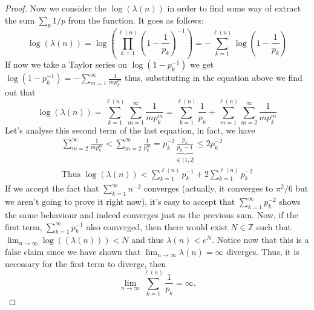 \begin{proof}
   Now we consider the \(\log(\lambda(n))\) in order to find some way of extract
   the sum \(\sum_p 1/p\) from the function. It goes as follows:
   \[
      \log(\lambda(n)) 
      = \log \left( \prod_{k=1}^{\ell(n)} \left(1 - \frac{1}{p_k}\right)^{-1} \right) 
      = - \sum_{k=1}^{\ell(n)} \log \left( 1 - \frac{1}{p_k} \right) 
   \] 
   If now we take a Taylor series on \(\log(1 - p_k^{-1})\) we get
   \(\log(1-p_k^{-1}) = -\sum_{m=1}^\infty \frac{1}{m p_k^m}\) thus, substituting
   in the equation above we find out that 
   \[
      \log(\lambda(n)) = \sum_{k=1}^{\ell(n)} \sum_{m = 1}^\infty \frac{1}{mp_k^m}
      = \sum_{k = 1}^{\ell(n)} \frac{1}{p_k} + \sum_{m = 1}^{\ell(n)}
      \sum_{m=2}^\infty \frac{1}{mp_k^{m}}
   \] 
   Let's analyse this second term of the last equation, in fact, we have
   \begin{gather*}
      \sum_{m=2}^\infty \frac{1}{mp_k^{m}} < \sum_{m=2}^\infty \frac{1}{p_k^m} =
      p_k^{-2} \underbrace{\frac{p_k}{p_k - 1}}_{\in (1, 2]} \leqslant 2 p_k^{-2}
      \\
      \text{Thus } \log(\lambda(n)) < \sum_{k=1}^{\ell(n)} p_k^{-1} + 2
      \sum_{k=1}^{\ell(n)} p_k^{-2}
   \end{gather*}
   If we accept the fact that \(\sum_{k = 1}^\infty n^{-2}\) converges
   (actually, it converges to \(\pi^2/6\) but we aren't going to prove it right
   now), it's easy to accept that \(\sum_{k = 1}^\infty p_k^{-2}\) shows the
   same behaviour and indeed converges just as the previous sum. Now, if the
   first term,  \(\sum_{k=1}^\infty p_k^{-1}\) also converged, then there would
   exist \(N \in \mathbb{Z}\) such that \(\lim_{n\to\infty}\log((\lambda(n))) <
   N\) and thus \(\lambda(n) < e^N\). Notice now that this is a false claim
   since we have shown that \(\lim_{n \to \infty} \lambda(n) = \infty\)
   diverges. Thus, it is necessary for the first term to diverge, then
   \[
      \lim_{n \to \infty} \sum_{k=1}^{\ell(n)} \frac{1}{p_k} = \infty.
   \] 
\end{proof}
